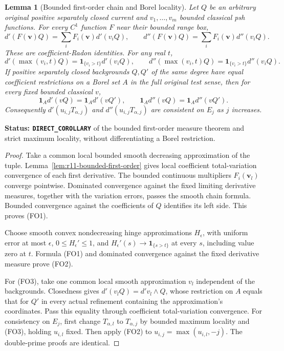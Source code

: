 \documentclass[11pt,a4paper]{article}
\numberwithin{equation}{section}
\newtheorem{lemma}[theorem]{Lemma}
\theoremstyle{definition}
\theoremstyle{remark}
\begin{document}
\begin{lemma}[Bounded first-order chain and Borel locality]
\label{lem:r11-first-order-borel-locality}
Let $Q$ be an arbitrary original positive separately closed
current and $v_1,\ldots,v_m$ bounded classical psh functions.
For every $C^1$ function $F$ near their bounded range box,
\[
 d'(F(\mathbf v)Q)=\sum_i F_i(\mathbf v)d'(v_iQ),\qquad
 d''(F(\mathbf v)Q)=\sum_i F_i(\mathbf v)d''(v_iQ).
 \tag{FO1}
\]
These are coefficient-Radon identities. For any real $t$,
\[
 d'(\max(v_i,t)Q)=\mathbf1_{\{v_i>t\}}d'(v_iQ),\qquad
 d''(\max(v_i,t)Q)=\mathbf1_{\{v_i>t\}}d''(v_iQ).
 \tag{FO2}
\]
If positive separately closed backgrounds $Q,Q'$ of the
same degree have equal coefficient restrictions on a Borel
set $A$ in the full original test sense, then for every
fixed bounded classical $v$,
\[
 \mathbf1_A d'(vQ)=\mathbf1_A d'(vQ'),\qquad
 \mathbf1_A d''(vQ)=\mathbf1_A d''(vQ').
 \tag{FO3}
\]
Consequently $d'(u_{i,j}T_{\alpha,j})$ and
$d''(u_{i,j}T_{\alpha,j})$ are consistent on $E_j$
as $j$ increases.
\end{lemma}

\noindent\textbf{Status: \texttt{DIRECT\_COROLLARY}} of
the bounded first-order measure theorem and strict maximum
locality, without differentiating a Borel restriction.

\begin{proof}
Take a common local bounded smooth decreasing approximation
of the tuple. Lemma~\ref{lem:r11-bounded-first-order}
gives local coefficient total-variation convergence of each
first derivative. The bounded continuous multipliers
$F_i(\mathbf v_l)$ converge pointwise. Dominated convergence
against the fixed limiting derivative measures, together
with the variation errors, passes the smooth chain formula.
Bounded convergence against the coefficients of $Q$
identifies its left side. This proves (FO1).

Choose smooth convex nondecreasing hinge approximations
$H_\epsilon$, with uniform error at most $\epsilon$,
$0\leq H_\epsilon'\leq1$, and
$H_\epsilon'(s)\to\mathbf1_{\{s>t\}}$ at every $s$,
including value zero at $t$. Formula (FO1) and dominated
convergence against the fixed derivative measure prove (FO2).

For (FO3), take one common local smooth approximation $v_l$
independent of the backgrounds. Closedness gives
$d'(v_lQ)=d'v_l\wedge Q$, whose restriction on $A$
equals that for $Q'$ in every actual refinement containing
the approximation's coordinates. Pass this equality through
coefficient total-variation convergence.
For consistency on $E_j$, first change $T_{\alpha,l}$
to $T_{\alpha,j}$ by bounded maximum locality and (FO3),
holding $u_{i,l}$ fixed. Then apply (FO2) to
$u_{i,j}=\max(u_{i,l},-j)$. The double-prime proofs are identical.
\end{proof}
\end{document}
